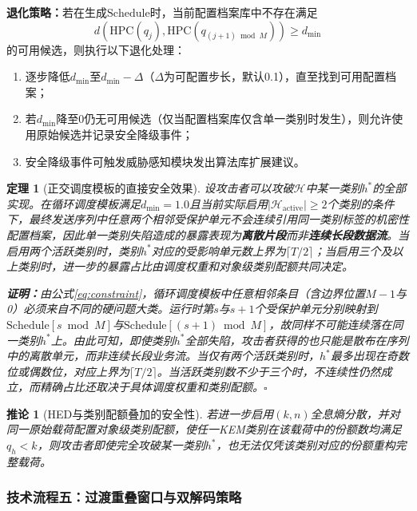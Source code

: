 ﻿\documentclass[12pt,a4paper]{article}
\newtheorem{theorem}{定理}
\newtheorem{corollary}{推论}
\begin{document}
{\normalfont\textbf{退化策略：}}若在生成$\text{Schedule}$时，当前配置档案库中不存在满足
\[
d(\mathrm{HPC}(q_j), \mathrm{HPC}(q_{(j+1)\bmod M})) \geq d_{\min}
\]
的可用候选，则执行以下退化处理：
\begin{enumerate}[label=(\roman*)]
    \item 逐步降低$d_{\min}$至$d_{\min} - \Delta$（$\Delta$为可配置步长，默认0.1），直至找到可用配置档案；
    \item 若$d_{\min}$降至0仍无可用候选（仅当配置档案库仅含单一类别时发生），则允许使用原始候选并记录安全降级事件；
    \item 安全降级事件可触发威胁感知模块发出算法库扩展建议。
\end{enumerate}

\begin{theorem}[正交调度模板的直接安全效果]
设攻击者可以攻破$\mathcal{H}$中某一类别$h^*$的全部实现。在循环调度模板满足$d_{\min}=1.0$且当前实际启用$|\mathcal{H}_{\text{active}}| \geq 2$个类别的条件下，最终发送序列中任意两个相邻受保护单元不会连续引用同一类别标签的机密性配置档案，因此单一类别失陷造成的暴露表现为{\normalfont\textbf{离散片段}}而非{\normalfont\textbf{连续长段数据流}}。当启用两个活跃类别时，类别$h^*$对应的受影响单元数上界为$\lceil T/2 \rceil$；当启用三个及以上类别时，进一步的暴露占比由调度权重和对象级类别配额共同决定。

{\normalfont\textbf{证明：}}由公式\eqref{eq:constraint}，循环调度模板中任意相邻条目（含边界位置$M-1$与0）必须来自不同的硬问题大类。运行时第$s$与$s+1$个受保护单元分别映射到$\text{Schedule}[s \bmod M]$与$\text{Schedule}[(s+1) \bmod M]$，故同样不可能连续落在同一类别$h^*$上。由此可知，即使类别$h^*$全部失陷，攻击者获得的也只能是散布在序列中的离散单元，而非连续长段业务流。当仅有两个活跃类别时，$h^*$最多出现在奇数位或偶数位，对应上界为$\lceil T/2 \rceil$。当活跃类别数不少于三个时，不连续性仍然成立，而精确占比还取决于具体调度权重和类别配额。$\square$
\end{theorem}

\begin{corollary}[HED与类别配额叠加的安全性]
若进一步启用$(k,n)$全息熵分散，并对同一原始载荷配置对象级类别配额，使任一KEM类别在该载荷中的份额数均满足$q_h < k$，则攻击者即使完全攻破某一类别$h^*$，也无法仅凭该类别对应的份额重构完整载荷。
\end{corollary}

\subsubsection*{技术流程五：过渡重叠窗口与双解码策略}
\end{document}

